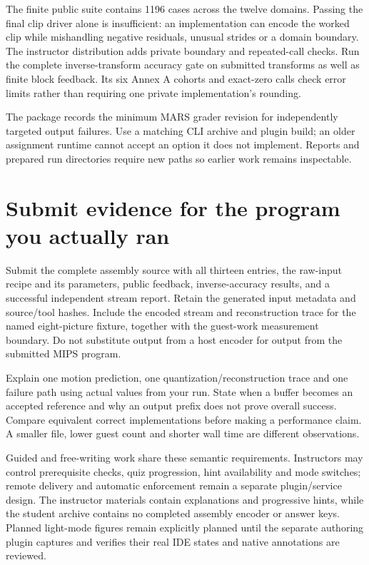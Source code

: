 The finite public suite contains 1196 cases across the twelve domains. Passing
the final clip driver alone is insufficient: an implementation can encode the
worked clip while mishandling negative residuals, unusual strides or a domain
boundary. The instructor distribution adds private boundary and repeated-call
checks. Run the complete inverse-transform accuracy gate on submitted transforms
as well as finite block feedback. Its six Annex A cohorts and exact-zero calls
check error limits rather than requiring one private implementation's rounding.

The package records the minimum MARS grader revision for independently targeted
output failures. Use a matching CLI archive and plugin build; an older assignment
runtime cannot accept an option it does not implement. Reports and prepared run
directories require new paths so earlier work remains inspectable.

\section{Submit evidence for the program you actually ran}
Submit the complete assembly source with all thirteen entries, the raw-input
recipe and its parameters, public feedback, inverse-accuracy results, and a
successful independent stream report. Retain the generated input metadata and
source/tool hashes. Include the encoded stream and reconstruction trace for the
named eight-picture fixture, together with the guest-work measurement boundary.
Do not substitute output from a host encoder for output from the submitted MIPS
program.

Explain one motion prediction, one quantization/reconstruction trace and one
failure path using actual values from your run. State when a buffer becomes an
accepted reference and why an output prefix does not prove overall success.
Compare equivalent correct implementations before making a performance claim.
A smaller file, lower guest count and shorter wall time are different observations.

Guided and free-writing work share these semantic requirements. Instructors may
control prerequisite checks, quiz progression, hint availability and mode switches;
remote delivery and automatic enforcement remain a separate plugin/service design.
The instructor materials contain explanations and progressive hints, while the
student archive contains no completed assembly encoder or answer keys. Planned
light-mode figures remain explicitly planned until the separate authoring plugin
captures and verifies their real IDE states and native annotations are reviewed.
